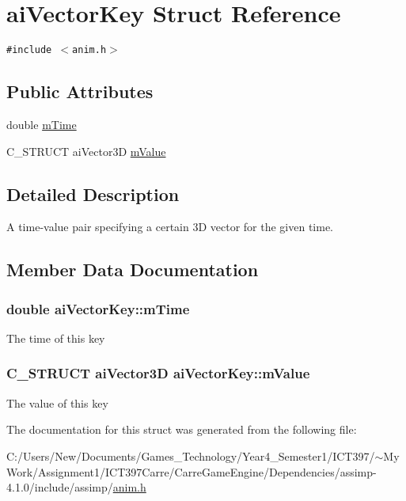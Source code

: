 \hypertarget{structai_vector_key}{
\section{aiVectorKey Struct Reference}
\label{structai_vector_key}
}
{\tt \#include $<$anim.h$>$}

\subsection*{Public Attributes}
\begin{CompactItemize}
\item 
double \hyperlink{structai_vector_key_b3c43c166434c7a505083d1929f675bc}{mTime}
\item 
C\_\-STRUCT aiVector3D \hyperlink{structai_vector_key_6f73649028b136a193dac21de35188ad}{mValue}
\end{CompactItemize}


\subsection{Detailed Description}
A time-value pair specifying a certain 3D vector for the given time. 

\subsection{Member Data Documentation}
\hypertarget{structai_vector_key_b3c43c166434c7a505083d1929f675bc}{
\subsubsection[mTime]{\setlength{\rightskip}{0pt plus 5cm}double {\bf aiVectorKey::mTime}}}
\label{structai_vector_key_b3c43c166434c7a505083d1929f675bc}


The time of this key \hypertarget{structai_vector_key_6f73649028b136a193dac21de35188ad}{
\subsubsection[mValue]{\setlength{\rightskip}{0pt plus 5cm}C\_\-STRUCT aiVector3D {\bf aiVectorKey::mValue}}}
\label{structai_vector_key_6f73649028b136a193dac21de35188ad}


The value of this key 

The documentation for this struct was generated from the following file:\begin{CompactItemize}
\item 
C:/Users/New/Documents/Games\_\-Technology/Year4\_\-Semester1/ICT397/$\sim$My Work/Assignment1/ICT397Carre/CarreGameEngine/Dependencies/assimp-4.1.0/include/assimp/\hyperlink{anim_8h}{anim.h}\end{CompactItemize}
